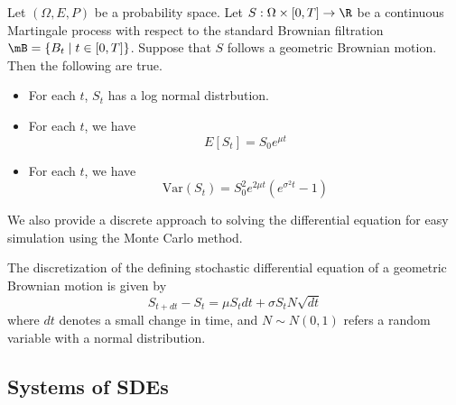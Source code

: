 \documentclass[a4paper]{article}
\begin{document}
\begin{prp}{}{} Let $(\Omega,E,P)$ be a probability space. Let $S:\Omega\times[0,T]\to\R$ be a continuous Martingale process with respect to the standard Brownian filtration $\mB=\{B_t\;|\;t\in[0,T]\}$. Suppose that $S$ follows a geometric Brownian motion. Then the following are true. 
\begin{itemize}
\item For each $t$, $S_t$ has a log normal distrbution. 
\item For each $t$, we have $$E[S_t]=S_0e^{\mu t}$$
\item For each $t$, we have $$\text{Var}(S_t)=S_0^2e^{2\mu t}(e^{\sigma^2 t}-1)$$
\end{itemize}
\end{prp}

We also provide a discrete approach to solving the differential equation for easy simulation using the Monte Carlo method. 

\begin{prp}{}{} The discretization of the defining stochastic differential equation of a geometric Brownian motion is given by $$S_{t+dt}-S_t=\mu S_tdt+\sigma S_tN\sqrt{dt}$$ where $dt$ denotes a small change in time, and $N\sim N(0,1)$ refers a random variable with a normal distribution. 
\end{prp}

\subsection{Systems of SDEs}
\end{document}
